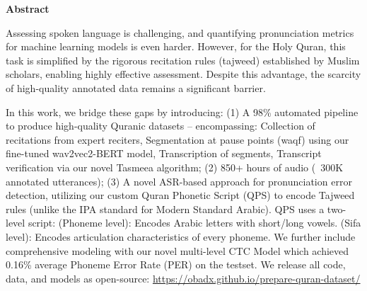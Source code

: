 % 
% 
%
\cleardoublepage
\newpage
\thispagestyle{empty}
{}

\begin{center}\huge \textbf{Abstract}\end{center}

Assessing spoken language is challenging, and quantifying pronunciation metrics for machine learning models is even harder. However, for the Holy Quran, this task is simplified by the rigorous recitation rules (tajweed) established by Muslim scholars, enabling highly effective assessment. Despite this advantage, the scarcity of high-quality annotated data remains a significant barrier.

In this work, we bridge these gaps by introducing:
(1) A 98\% automated pipeline to produce high-quality Quranic datasets – encompassing: Collection of recitations from expert reciters, Segmentation at pause points (waqf) using our fine-tuned wav2vec2-BERT model, Transcription of segments, Transcript verification via our novel Tasmeea algorithm;
(2) 850+ hours of audio (~300K annotated utterances);
(3) A novel ASR-based approach for pronunciation error detection, utilizing our custom Quran Phonetic Script (QPS) to encode Tajweed rules (unlike the IPA standard for Modern Standard Arabic). QPS uses a two-level script: (Phoneme level): Encodes Arabic letters with short/long vowels. (Sifa level): Encodes articulation characteristics of every phoneme. We further include comprehensive modeling with our novel multi-level CTC Model which achieved 0.16\% average Phoneme Error Rate (PER) on the testset. We release all code, data, and models as open-source: \href{https://obadx.github.io/prepare-quran-dataset/}{https://obadx.github.io/prepare-quran-dataset/}


